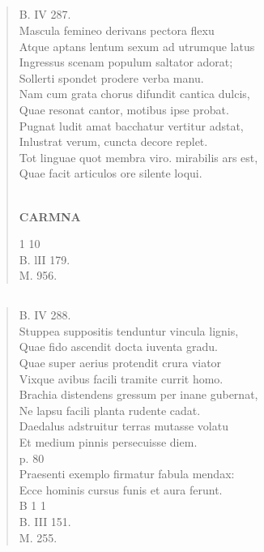 \documentclass[11pt, a4paper]{report}
\begin{document}
            \subsection*{}
      \begin{verse}
      B. IV 287. \\ Mascula femineo derivans pectora flexu \\ Atque aptans lentum sexum ad utrumque latus \\ Ingressus scenam populum saltator adorat; \\ Sollerti spondet prodere verba manu. \\ Nam cum grata chorus difundit cantica dulcis, \\ Quae resonat cantor, motibus ipse probat. \\ Pugnat ludit amat bacchatur vertitur adstat, \\ Inlustrat verum, cuncta decore replet. \\ Tot linguae quot membra viro. mirabilis ars est, \\ Quae facit articulos ore silente loqui. \\ 
        ﻿\pagebreak 
    \begin{center} \textbf{CARMNA} \end{center} \marginpar{[130]} 1 10 \\ B. lII 179. \\ M. 956. \\ 
      \end{verse}
  
            \subsection*{}
      \begin{verse}
      B. IV 288. \\ Stuppea suppositis tenduntur vincula lignis, \\ Quae fido ascendit docta iuventa gradu. \\ Quae super aerius protendit crura viator \\ Vixque avibus facili tramite currit homo. \\ Brachia distendens gressum per inane gubernat, \\ Ne lapsu facili planta rudente cadat. \\ Daedalus adstruitur terras mutasse volatu \\ Et medium pinnis persecuisse diem. \\ p. 80 \\ Praesenti exemplo firmatur fabula mendax: \\ Ecce hominis cursus funis et aura ferunt. \\ B 1 1 \\ B. III 151. \\ M. 255. \\ 
      \end{verse}
  
\end{document}
